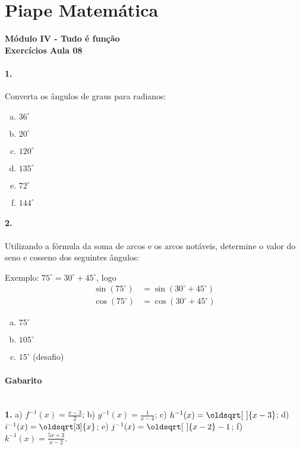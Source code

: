 \documentclass[a4paper,12pt]{article}
\renewcommand*{\sqrt}[2][\ ]{\oldsqrt[#1]{#2}}
\begin{document}
 
  
\section*{Piape Matemática} 
\textbf{Módulo IV - Tudo é função}\\
\textbf{Exercícios Aula 08}    

\begin{multicols}{2} 
 
\paragraph*{1.}  Converta os ângulos de graus para radianos:
\begin{enumerate}[a)]
\item $36^{\circ}$
\item $20^{\circ}$
\item $120^{\circ}$
\item $135^{\circ}$
\item $72^{\circ}$
\item $144^{\circ}$
\end{enumerate}
 
\paragraph*{2.} Utilizando a fórmula da soma de arcos e os arcos notáveis, determine o valor do seno e cosseno dos seguintes ângulos:
 
Exemplo: $75^{\circ} = 30^{\circ} + 45^{\circ}$, logo
\begin{align*}
    \sin(75^{\circ}) &= \sin(30^{\circ} + 45^{\circ}) \\
    \cos(75^{\circ}) &= \cos(30^{\circ} + 45^{\circ}) 
\end{align*} 

\begin{enumerate}[a)]
    \item $75^{\circ}$
    \item $105^{\circ}$
    \item $15^{\circ}$ (desafio)
\end{enumerate}

\end{multicols}

\vspace*{\fill}
{\footnotesize
\paragraph*{Gabarito} \hspace*{\fill}\\
\textbf{1.} a) $f^{-1}(x) = \frac{x-3}{2}$; b) $g^{-1}(x) = \frac{1}{x-4}$; c) $h^{-1}(x) = \sqrt{x-3}$; d) $i^{-1}(x) = \sqrt[3]{x}$; e) $j^{-1}(x) = \sqrt{x-2} - 1 $; f) $k^{-1}(x) = \frac{5x + 3}{x - 2}$.
}
\end{document}
